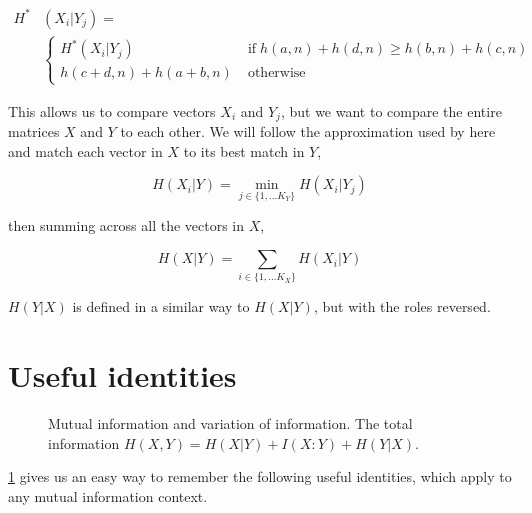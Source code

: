 \documentclass[9pt,technote]{IEEEtran}
\begin{document}
\begin{equation}
	\begin{split}
	H^* & (X_i | Y_j) = \\
	& \left\{
		\begin{split}
			H^*(X_i | Y_j) \; & \mbox{if} \; h(a,n) + h(d,n) \geq h(b,n) + h(c,n) \\
			h(c+d,n)+h(a+b,n) \;  & \mbox{otherwise}
		\end{split}
	\right.
	\end{split}
	\label{eqnNoComplements}
\end{equation}

This allows us to compare vectors $X_i$ and $Y_j$, but we want to compare the entire matrices
$X$ and $Y$ to each other. We will follow the approximation used by \lfk here and
match each vector in $X$ to its best match in $Y$,

\begin{equation}
	H(X_i | Y) = \underset{j \in \{1,\dots K_Y \}}{\min} H(X_i | Y_j)
	\label{eqnBestMatch}
\end{equation}

then summing across all the vectors in $X$,

\begin{equation}
	H(X | Y) = \sum_{i \in \{1,\dots K_X \}} H(X_i | Y)
	\label{eqnSumVectors}
\end{equation}

$H(Y|X)$ is defined in a similar way to $H(X|Y)$, but with the roles reversed.

\section{Useful identities}

\begin{figure}
	\centering
{}
\caption{\label{figVenn} Mutual information and variation of information. The total information $H(X,Y) = H(X|Y) + I(X:Y) + H(Y|X)$. }
\end{figure}


\cref{figVenn} gives us an easy way to remember the following useful identities, which
apply to any mutual information context.
\end{document}
